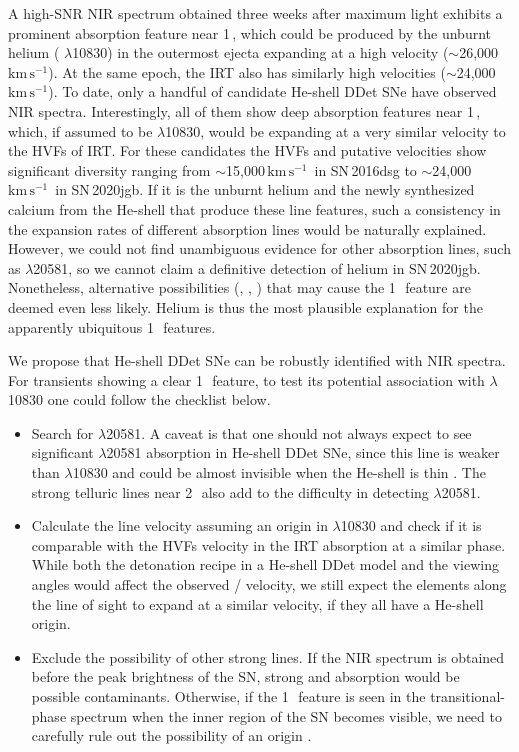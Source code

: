 \documentclass[twocolumn]{aastex631}
\newcommand{\sn}{SN\,2020jgb}
\newcommand{\kms}{$\mathrm{km}\,\mathrm{s}^{-1}$}
\begin{document}
\begin{CJK*}{UTF8}{gbsn}
A high-SNR NIR spectrum obtained three weeks after maximum light exhibits a prominent absorption feature near 1\,\micron, which could be produced by the unburnt helium ( $\lambda$10830) in the outermost ejecta expanding at a high velocity ($\sim$26,000\,\kms). At the same epoch, the  IRT also has similarly high velocities ($\sim$24,000\,\kms). To date, only a handful of candidate He-shell DDet SNe have observed NIR spectra. Interestingly, all of them show deep absorption features near 1\,\micron, which, if assumed to be  $\lambda$10830, would be expanding at a very similar velocity to the HVFs of  IRT. For these candidates the  HVFs and putative  velocities show significant diversity ranging from $\sim$15,000\,\kms\ in SN\,2016dsg to $\sim$24,000\,\kms\ in \sn. If it is the unburnt helium and the newly synthesized calcium from the He-shell that produce these line features, such a consistency in the expansion rates of different absorption lines would be naturally explained. However, we could not find unambiguous evidence for other  absorption lines, such as  $\lambda$20581, so we cannot claim a definitive detection of helium in \sn. Nonetheless, alternative possibilities (, , ) that may cause the 1\,\micron\ feature are deemed even less likely. Helium is thus the most plausible explanation for the apparently ubiquitous 1\,\micron\ features.

We propose that He-shell DDet SNe can be robustly identified with NIR spectra. For transients showing a clear 1\,\micron\ feature, to test its potential association with  $\lambda$10830 one could follow the checklist below.
\begin{itemize}
    \item Search for  $\lambda$20581. A caveat is that one should not always expect to see significant  $\lambda$20581 absorption in He-shell DDet SNe, since this line is weaker than  $\lambda$10830 and could be almost invisible when the He-shell is thin \citep{Boyle2017_Helium}. The strong telluric lines near 2\,\micron\ also add to the difficulty in detecting  $\lambda$20581.
    \item Calculate the line velocity assuming an origin in  $\lambda$10830 and check if it is comparable with the HVFs velocity in the  IRT absorption at a similar phase. While both the detonation recipe in a He-shell DDet model and the viewing angles would affect the observed / velocity, we still expect the elements along the line of sight to expand at a similar velocity, if they all have a He-shell origin.
    \item Exclude the possibility of other strong lines. If the NIR spectrum is obtained before the peak brightness of the SN, strong  and  absorption \citep{Hsiao_CSP_2019} would be possible contaminants. Otherwise, if the 1\,\micron\ feature is seen in the transitional-phase spectrum when the inner region of the SN becomes visible, we need to carefully rule out the possibility of an  origin \citep{Marion2009_NIR}.
\end{itemize}


\end{CJK*}
\end{document}
